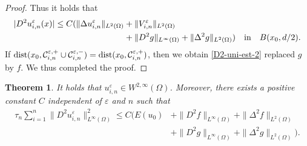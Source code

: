 \documentclass[12pt]{amsart}
\newtheorem{thm}{Theorem}[section]
\begin{document}
\begin{proof}
Thus it holds that 
\begin{align} \label{D2-uni-est-2}
| D^2 u^{\varepsilon}_{i,n}(x)| \le C ( \| \Delta u^{\varepsilon}_{i,n} \|_{L^{2}(\Omega)} & + \| V^{\varepsilon}_{i,n} \|_{L^{2}(\Omega)} \\
  & + \| D^{2} g \|_{L^{\infty}(\Omega)} + \| \Delta^{2} g \|_{L^{2}(\Omega)}) \notag
\quad \text{in} \quad B(x_{0}, d/2). 
\end{align}
If ${\rm dist}(x_{0},{\mathcal{C}}^{{\varepsilon},+}_{i,n} \cup {\mathcal{C}}^{{\varepsilon},-}_{i,n})= {\rm dist}(x_{0},{\mathcal{C}}^{{\varepsilon},+}_{i,n})$, 
then we obtain \eqref{D2-uni-est-2} replaced $g$ by $f$. 
We thus completed the proof. 
\end{proof}

\begin{thm} \label{C-1-1_u-in}
It holds that $u^{\varepsilon}_{i,n} \in W^{2, \infty}(\Omega)$. Moreover, there exists a positive constant $C$ independent of ${\varepsilon}$ 
and $n$ such that 
\begin{align*}
\tau_n \sum^{n}_{i=1} \| D^2 u^{\varepsilon}_{i,n} \|^2_{L^\infty(\Omega)} 
\le C ( E(u_0) & + \| D^{2} f \|_{L^{\infty}(\Omega)} + \| \Delta^{2} f \|_{L^{2}(\Omega)} \\
      & + \| D^{2} g \|_{L^{\infty}(\Omega)} + \| \Delta^{2} g \|_{L^{2}(\Omega)}). 
\end{align*}
\end{thm}
\end{document}
